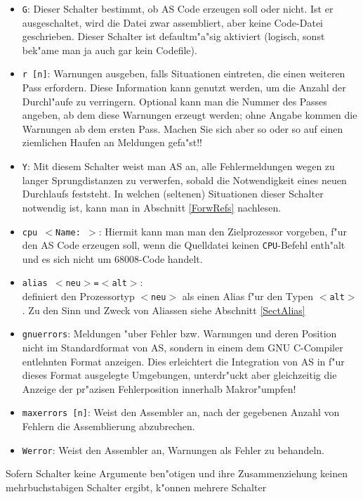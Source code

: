 \documentclass[12pt,a4paper,twoside]{report}
\newcommand{\tty}[1]{{\tt #1}}
\begin{document}
\begin{itemize}
\item{\tty{G}: Dieser Schalter bestimmt, ob AS Code erzeugen soll oder nicht.
      Ist er ausgeschaltet, wird die Datei zwar assembliert,
      aber keine Code-Datei geschrieben. Dieser Schalter ist defaultm"a"sig aktiviert
      (logisch, sonst bek"ame man ja auch gar kein Codefile).}
\item{\tty{r [n]}: Warnungen ausgeben, falls Situationen eintreten, die
      einen weiteren Pass erfordern.  Diese Information kann genutzt
      werden, um die Anzahl der Durchl"aufe zu verringern.  Optional kann
      man die Nummer des Passes angeben, ab dem diese Warnungen erzeugt
      werden; ohne Angabe kommen die Warnungen ab dem ersten Pass.  Machen
      Sie sich aber so oder so auf einen ziemlichen Haufen an Meldungen
      gefa"st!!}
\item{\tty{Y}: Mit diesem Schalter weist man AS an, alle Fehlermeldungen
      wegen zu langer Sprungdistanzen zu verwerfen, sobald die Notwendigkeit
      eines neuen Durchlaufs feststeht.  In welchen (seltenen) Situationen
      dieser Schalter notwendig ist, kann man in Abschnitt \ref{ForwRefs}
      nachlesen.}
\item{\tty{cpu $<$Name:  $>$}: Hiermit kann man man den Zielprozessor
      vorgeben, f"ur den AS Code erzeugen soll, wenn die Quelldatei keinen
      {\tt CPU}-Befehl enth"alt und es sich nicht um 68008-Code handelt.}
\item{\tty{alias $<$neu$>$=$<$alt$>$}:\\
      definiert den Prozessortyp \tty{$<$neu$>$} als einen Alias f"ur den
      Typen \tty{$<$alt$>$}.  Zu den Sinn und Zweck von Aliassen siehe
      Abschnitt \ref{SectAlias}}
\item{{\tt gnuerrors}: Meldungen "uber Fehler bzw. Warnungen und deren
      Position nicht im Standardformat von AS, sondern in einem dem GNU
      C-Compiler entlehnten Format anzeigen.  Dies erleichtert die
      Integration von AS in f"ur dieses Format ausgelegte Umgebungen,
      unterdr"uckt aber gleichzeitig die Anzeige der pr"azisen
      Fehlerposition innerhalb Makror"umpfen!}
\item{{\tt maxerrors [n]}: Weist den Assembler an, nach der gegebenen
      Anzahl von Fehlern die Assemblierung abzubrechen.}
\item{{\tt Werror}: Weist den Assembler an, Warnungen als Fehler zu
      behandeln.}
\end{itemize}
Sofern Schalter keine Argumente ben"otigen und ihre Zusammenziehung
keinen mehrbuchstabigen Schalter ergibt, k"onnen mehrere Schalter
\end{document}
